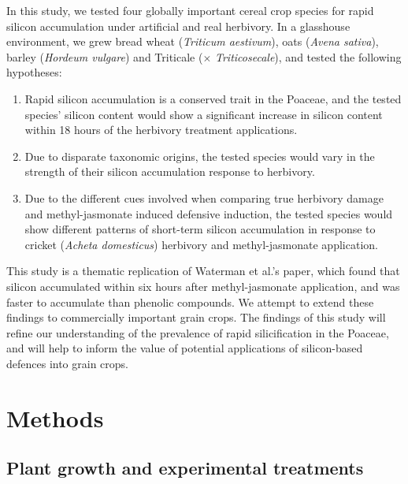 \documentclass[12pt, letterpaper, ]{report}
\begin{document}
In this study, we tested four globally important cereal crop species for rapid silicon accumulation under artificial and real herbivory. In a glasshouse environment, we grew bread wheat (\textit{Triticum aestivum}), oats (\textit{Avena sativa}), barley (\textit{Hordeum vulgare}) and Triticale ($\times$ \textit{Triticosecale}), and tested the following hypotheses:
\begin{enumerate}
        \item Rapid silicon accumulation is a conserved trait in the Poaceae, and the tested species' silicon content would show a significant increase in silicon content within 18 hours of the herbivory treatment applications.
        \item Due to disparate taxonomic origins, the tested species would vary in the strength of their silicon accumulation response to herbivory. 
        \item Due to the different cues involved when comparing true herbivory damage and methyl-jasmonate induced defensive induction, the tested species would show different patterns of short-term silicon accumulation in response to cricket (\textit{Acheta domesticus}) herbivory and methyl-jasmonate application. 
\end{enumerate}
This study is a thematic replication of Waterman et al.’s  paper, which found that silicon accumulated within six hours after methyl-jasmonate application, and was faster to accumulate than phenolic compounds. We attempt to extend these findings to commercially important grain crops. The findings of this study will refine our understanding of the prevalence of rapid silicification in the Poaceae, and will help to inform the value of potential applications of silicon-based defences into grain crops.

\section{Methods}

\subsection{Plant growth and experimental treatments}
\end{document}
